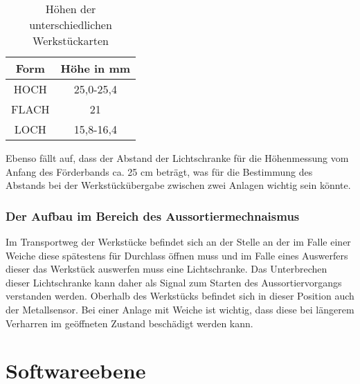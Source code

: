 \begin{table}[h]
    \begin{center}
        \begin{tabular}{ |c|c| }
            \hline
            Form                     & Höhe in mm \\
            \hline\hline
            HOCH                 &  25,0-25,4\\
            \hline
            FLACH                     & 21 \\
            \hline
            LOCH               & 15,8-16,4 \\
            \hline
        \end{tabular}
    \end{center}
    \caption{Höhen der unterschiedlichen Werkstückarten}
    \label{tab:werkstuecke}
\end{table}

Ebenso fällt auf, dass der Abstand der Lichtschranke für die Höhenmessung vom Anfang des Förderbands ca. 25 cm beträgt, was für die Bestimmung des Abstands bei der Werkstückübergabe zwischen zwei Anlagen wichtig sein könnte.

\subsubsection{Der Aufbau im Bereich des Aussortiermechnaismus}

Im Transportweg der Werkstücke befindet sich an der Stelle an der im Falle einer Weiche diese spätestens für Durchlass öffnen muss und im Falle eines Auswerfers dieser das Werkstück auswerfen muss eine Lichtschranke.
Das Unterbrechen dieser Lichtschranke kann daher als Signal zum Starten des Aussortiervorgangs verstanden werden. 
Oberhalb des Werkstücks befindet sich in dieser Position auch der Metallsensor.
Bei einer Anlage mit Weiche ist wichtig, dass diese bei längerem Verharren im geöffneten Zustand beschädigt werden kann.

\section{Softwareebene}\label{sec:softwareebene}



